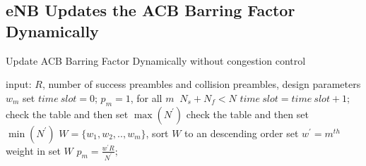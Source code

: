     \subsection{eNB Updates the ACB Barring Factor Dynamically}
    \begin{algorithm}
      \caption{Update ACB Barring Factor Dynamically without congestion control}
        \begin{algorithmic}[1]
        \State input: $R$, number of success preambles and collision preambles, design parameters $w_m$
        \State set $time\ slot=0$; $p_m=1$, for all $m$
        \While $\ N_s+N_f<N$
        \State $time\ slot= time\ slot + 1$;
         \State check the table and then set $\max(N^\prime)$
          \Else
          \State check the table and then set $\min(N^\prime)$
                   \State $W=\{w_1,w_2,..,w_m\}$, sort $W$ to an descending order
                   \State set $w^\prime = m^{th}$ weight in set $W$
                   \State $p_{m}=\frac{w^\prime R}{N^\prime};$
            \EndIf
          \EndWhile
          \end{algorithmic}
     \end{algorithm}

